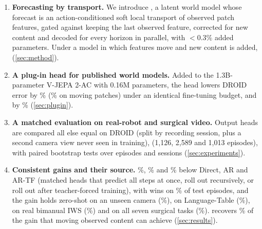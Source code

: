 \begin{enumerate}[label=\arabic*.,leftmargin=1.3em,itemsep=0pt,topsep=1pt,parsep=0pt]
  \item \textbf{Forecasting by transport.} We introduce \ours{}, a latent world model whose forecast is an
  action-conditioned soft local transport of observed patch features, gated against keeping the last observed feature,
  corrected for new content and decoded for every horizon in parallel, with $<\!0.3\%$ added parameters. Under a model in which features
  move and new content is added,  (\cref{sec:method}).
  \item \textbf{A plug-in head for published world models.} Added to the 1.3B-parameter V-JEPA 2-AC with 0.16M
  parameters, the head lowers DROID error by \vjepaMSERed\% (\vjepaMovingRed\% on moving patches) under an identical
  fine-tuning budget, and  by \dinowmPushtErrRed\% (\cref{sec:plugin}).
  \item \textbf{A matched evaluation on real-robot and surgical video.} Output heads are compared all else equal on
  DROID (split by recording session, plus a second camera view never seen in training),  (1{,}126,
  2{,}589 and 1{,}013 episodes), with paired bootstrap tests over episodes and sessions (\cref{sec:experiments}).
  \item \textbf{Consistent gains and their source.}  \droidVsDirect\%, \droidVsAR\% and
  \droidVsARTF\% below Direct, AR and AR-TF (matched heads that predict all steps at once, roll out recursively, or roll out after
  teacher-forced training), with wins on \wmWinDirect\% of test episodes, and the gain holds zero-shot
  on an unseen camera (\camtwoVsDirect\%), on Language-Table (\ltVsDirect\%), on real bimanual IWS (\iwsVsDirect\%) and on all seven surgical tasks
  (\hamlynVsDirect\%). \ours{} recovers \geoShareShift\% of the gain that moving observed content can achieve
  (\cref{sec:results}).
\end{enumerate}
